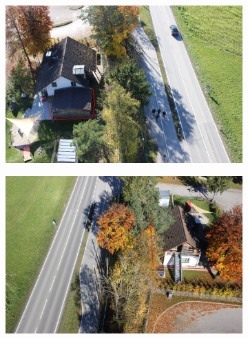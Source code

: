 \begin{figure}[H]
\begin{subfigure}[tbp]{0.31\columnwidth}
           \caption[]{}%
           {{\small }}   
           \label{fig:5f}
       \end{subfigure} 
       \begin{subfigure}[tbp]{0.31\columnwidth}
           \centering
           \includegraphics[width=\textwidth]{optimize/IMG_1367_xy.png}
           \caption[]{}%
           {{\small }}
           \label{fig:5g}
       \end{subfigure}
       \begin{subfigure}[tbp]{0.31\columnwidth}  
           \centering 
           \includegraphics[width=\textwidth]{optimize/IMG_1604_xy.png}
           \caption[]{}%
           {{\small }}    
           \label{fig:5h}
       \end{subfigure}
       \begin{subfigure}[tbp]{0.31\columnwidth}  
           \centering 

\end{subfigure}
\end{figure}
